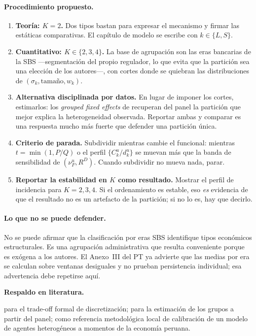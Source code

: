 \documentclass[11pt]{article}
\newcommand{\lit}{\par\noindent\textbf{Respaldo en literatura.}\par}
\theoremstyle{definition}
\begin{document}
\paragraph{Procedimiento propuesto.}
\begin{enumerate}[leftmargin=*,itemsep=2pt]
\item \textbf{Teor\'ia: $K=2$.} Dos tipos bastan para expresar el mecanismo y
firmar las est\'aticas comparativas. El cap\'itulo de modelo se escribe con
$k\in\{L,S\}$.
\item \textbf{Cuantitativo: $K\in\{2,3,4\}$.} La base de agrupaci\'on son las eras
bancarias de la SBS \citep{sbs} ---segmentaci\'on del propio regulador, lo que evita que la
partici\'on sea una elecci\'on de los autores---, con cortes donde se quiebran las
distribuciones de $(\sigma_k,\text{tama\~no},w_k)$.
\item \textbf{Alternativa disciplinada por datos.} En lugar de imponer los
cortes, estimarlos: los \emph{grouped fixed effects} de
\citet{bonhommemanresa2015} recuperan del panel la partici\'on que mejor explica
la heterogeneidad observada. Reportar ambas y comparar es una respuesta mucho m\'as
fuerte que defender una partici\'on \'unica.
\item \textbf{Criterio de parada.} Subdividir mientras cambie el funcional:
mientras $t=\min(1,P/Q)$ o el perfil $\{C^u_k/d^u_k\}$ se muevan m\'as que la
banda de sensibilidad de $(\nu^u_F,R^D)$. Cuando subdividir no mueva nada, parar.
\item \textbf{Reportar la estabilidad en $K$ como resultado.} Mostrar el perfil
de incidencia para $K=2,3,4$. Si el ordenamiento es estable, eso \emph{es}
evidencia de que el resultado no es un artefacto de la partici\'on; si no lo es,
hay que decirlo.
\end{enumerate}

\paragraph{Lo que no se puede defender.} No se puede afirmar que la
clasificaci\'on por eras SBS identifique tipos econ\'omicos estructurales. Es una
agrupaci\'on administrativa que resulta conveniente porque es exógena a los
autores. El Anexo~III del PT ya advierte que las medias por era se calculan sobre
ventanas desiguales y no prueban persistencia individual; esa advertencia debe
repetirse aqu\'i.

\lit
\citet{bonhomme2022} para el trade-off formal de discretizaci\'on;
\citet{bonhommemanresa2015} para la estimaci\'on de los grupos a partir del panel;
\citet{salinas2024} como referencia metodol\'ogica local de calibraci\'on de un
modelo de agentes heterog\'eneos a momentos de la econom\'ia peruana.
\end{document}
